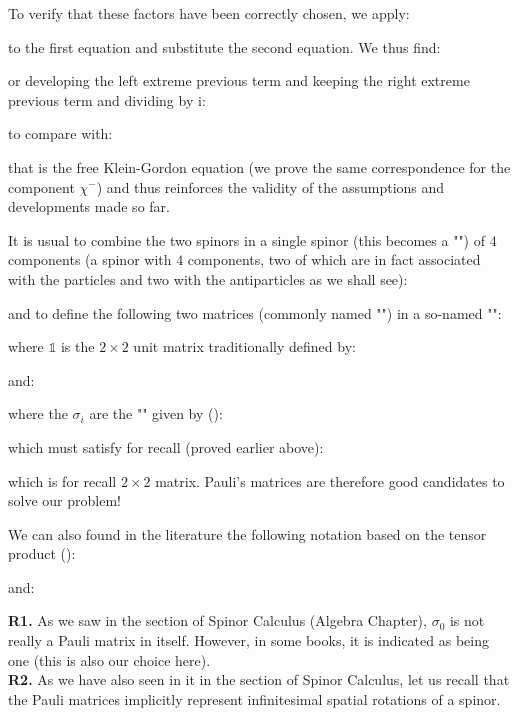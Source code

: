 	To verify that these factors have been correctly chosen, we apply:
	
	to the first equation and substitute the second equation. We thus find:
	
	or developing the left extreme previous term and keeping the right extreme previous term and dividing by $\mathrm{i}$:
	
	to compare with:
	
	that is the free Klein-Gordon equation (we prove the same correspondence for the component $\chi^{-}$) and thus reinforces the validity of the assumptions and developments made so far.

	It is usual to combine the two spinors in a single spinor (this becomes a "") of $4$ components (a spinor with $4$ components, two of which are in fact associated with the particles and two with the antiparticles as we shall see):
	
	and to define the following two matrices (commonly named "") in a so-named "":
	
	where $\mathds{1}$ is the $2\times 2$ unit matrix traditionally defined by:
	
	and:
	
	where the $\sigma_i$ are the "\label{pauli matrices}" given by ():
	
	which must satisfy for recall (proved earlier above):
	
	which is for recall $2\times 2$ matrix. Pauli's matrices are therefore good candidates to solve our problem!
	
	We can also found in the literature the following notation based on the tensor product ():
	
	and:
	
	\begin{tcolorbox}[title=Remarks,colframe=black,arc=10pt]
	\textbf{R1.} As we saw in the section of Spinor Calculus (Algebra Chapter), $\sigma_0$ is not really a Pauli matrix in itself. However, in some books, it is indicated as being one (this is also our choice here).\\
	
	\textbf{R2.} As we have also seen in it in the section of Spinor Calculus, let us recall that the Pauli matrices implicitly represent infinitesimal spatial rotations of a spinor.
	\end{tcolorbox}
	
